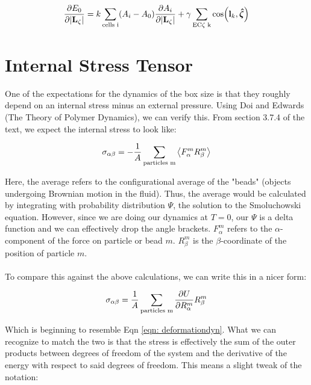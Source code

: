 \documentclass[12pt]{article}
\begin{document}
\begin{center}
\begin{equation}
\label{eqn: pbcd2}
\pdv{E_0}{|\vb{L}_\zeta|} = k \sum\limits_{\text{cells i}} (A_i - A_0) \pdv{A_i}{|\vb{L}_\zeta|} + \gamma \sum\limits_{\text{EC}\zeta\text{ k}} \cos(\vb{l}_k, \vu*{\zeta}) 
\end{equation}
\end{center}
\section{Internal Stress Tensor}

One of the expectations for the dynamics of the box size is that they roughly depend on an internal stress minus an external pressure. Using Doi and Edwards (The Theory of Polymer Dynamics), we can verify this. From section 3.7.4 of the text, we expect the internal stress to look like:
\begin{center}
\begin{equation}
\label{eqn: doiedwards_internalstress}
\sigma_{\alpha \beta} = -\frac{1}{A} \sum\limits_{\text{particles m}} \expval{F_\alpha^m R_\beta^m}
\end{equation}
\end{center}
Here, the average refers to the configurational average of the "beads" (objects undergoing Brownian motion in the fluid). Thus, the average would be calculated by integrating with probability distribution $\Psi$, the solution to the Smoluchowski equation. However, since we are doing our dynamics at $T=0$, our $\Psi$ is a delta function and we can effectively drop the angle brackets. $F_\alpha^m$ refers to the $\alpha$-component of the force on particle or bead $m$. $R_\beta^m$ is the $\beta$-coordinate of the position of particle $m$. \\ \\
To compare this against the above calculations, we can write this in a nicer form:
\begin{center}
\begin{equation}
\label{eqn: stress_alternative}
\sigma_{\alpha \beta} = \frac{1}{A} \sum\limits_{\text{particles m}} \pdv{U}{R_\alpha^m} R_\beta^m
\end{equation}
\end{center} 
Which is beginning to resemble Eqn \ref{eqn: deformationdyn}. What we can recognize to match the two is that the stress is effectively the sum of the outer products between degrees of freedom of the system and the derivative of the energy with respect to said degrees of freedom. This means a slight tweak of the notation:
\end{document}
